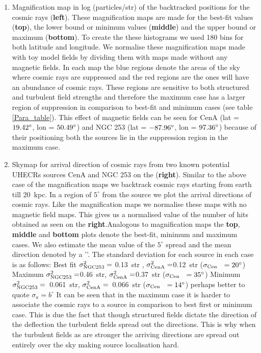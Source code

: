 \documentclass[usenatbib]{mnras}
\newcommand{\Andrew}[1]{\textcolor{dg}{#1}}
\begin{document}
\begin{enumerate}
    \item Magnification map in log (particles/str) of the backtracked positions for the cosmic rays (\textbf{left}). These magnification maps are made for the best-fit values (\textbf{top}), the lower bound or minimum values (\textbf{middle}) and the upper bound or maximum (\textbf{bottom}).
    To create the these histograms we used 180 bins for both latitude and longitude. 
    We normalise these magnification maps made with toy model fields by dividing them with maps made without any magnetic fields. In each map the blue regions denote the areas of the sky where cosmic rays are suppressed and the red regions are the ones will have an abundance of cosmic rays. These regions are sensitive to both structured and turbulent field strengths and therefore the maximum case has a larger region of suppression in comparison to best-fit and minimum cases (see table \ref{Para_table}). This effect of magnetic fields can be seen for CenA (lat = $\rm 19.42^{\circ}$, lon = $\rm 50.49^{\circ}$) and NGC 253 (lat = $\rm -87.96^{\circ}$, lon = $\rm 97.36^{\circ}$) because of their positioning both the sources lie in the suppression region in the maximum case.
    \item Skymap for arrival direction
    of cosmic rays from two known potential UHECRs sources CenA and NGC 253 on the (\textbf{right}). Similar to the above case of the magnification maps we backtrack cosmic rays starting from earth till 20~kpc. In a region of $5^{\circ}$ from the source we plot the arrival directions of cosmic rays. Like the magnification maps we normalise these maps with no magnetic field maps.  This gives us a normalised value of the number of hits obtained as seen on the \textbf{right}.Analogous to magnification maps the \textbf{top}, \textbf{middle} and \textbf{bottom} plots denote the best-fit, minimum and maximum cases. We also estimate the mean value of the $5^{\circ}$ spread and the mean direction denoted by a '\cdot'. 
    The standard deviation for each source in each case is as follows:
    \subitem Best fit $\sigma^2_{\rm NGC 253} = $ 0.13~str , $\sigma^2_{\rm Cen A} = $0.12~str \Andrew{($\sigma_{\rm Cen~~}=20^{\circ}$)}
    \subitem Maximum $\sigma^2_{\rm NGC 253} = $0.46~str, $\sigma^2_{\rm Cen A} = $0.37~str \Andrew{($\sigma_{\rm Cen~~}=35^{\circ}$)}
    \subitem Minimum $\sigma^2_{\rm NGC 253} = $~0.061~str, $\sigma^2_{\rm Cen A} = $~0.066~str \Andrew{($\sigma_{\rm Cen~~}=14^{\circ}$)}\newline
    \Andrew{perhaps better to quote $\sigma_{a}= b^{\circ}$}
    It can be seen that in the maximum case it is harder to associate the cosmic rays to a source in comparison to best first or minimum case. This is due the fact that though structured fields dictate the direction of the deflection the turbulent fields spread out the directions. This is why when the turbulent fields as are stronger the arriving directions are spread out entirely over the sky making source localisation hard.
    \end{enumerate}
    
\end{document}
